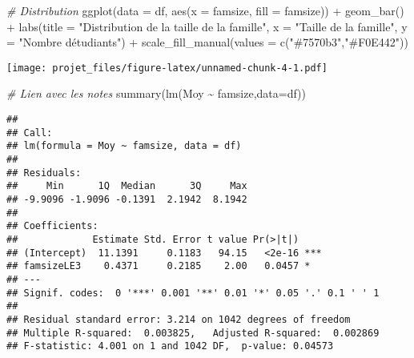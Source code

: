 \documentclass[
]{article}
\newenvironment{Shaded}{\begin{snugshade}}{\end{snugshade}}
\newcommand{\AttributeTok}[1]{\textcolor[rgb]{0.77,0.63,0.00}{#1}}
\newcommand{\CommentTok}[1]{\textcolor[rgb]{0.56,0.35,0.01}{\textit{#1}}}
\newcommand{\FunctionTok}[1]{\textcolor[rgb]{0.00,0.00,0.00}{#1}}
\newcommand{\NormalTok}[1]{#1}
\newcommand{\SpecialCharTok}[1]{\textcolor[rgb]{0.00,0.00,0.00}{#1}}
\newcommand{\StringTok}[1]{\textcolor[rgb]{0.31,0.60,0.02}{#1}}
\begin{document}
\begin{Shaded}
\begin{Highlighting}[]
\CommentTok{\# Distribution}
\FunctionTok{ggplot}\NormalTok{(}\AttributeTok{data =}\NormalTok{ df, }\FunctionTok{aes}\NormalTok{(}\AttributeTok{x =}\NormalTok{ famsize, }\AttributeTok{fill =}\NormalTok{ famsize)) }\SpecialCharTok{+}
  \FunctionTok{geom\_bar}\NormalTok{() }\SpecialCharTok{+}
  \FunctionTok{labs}\NormalTok{(}\AttributeTok{title =} \StringTok{"Distribution de la taille de la famille"}\NormalTok{,}
       \AttributeTok{x =} \StringTok{"Taille de la famille"}\NormalTok{, }\AttributeTok{y =} \StringTok{"Nombre d\textquotesingle{}étudiants"}\NormalTok{) }\SpecialCharTok{+}
  \FunctionTok{scale\_fill\_manual}\NormalTok{(}\AttributeTok{values =} \FunctionTok{c}\NormalTok{(}\StringTok{"\#7570b3"}\NormalTok{,}\StringTok{"\#F0E442"}\NormalTok{))}
\end{Highlighting}
\end{Shaded}

\texttt{[image: projet\_files/figure-latex/unnamed-chunk-4-1.pdf]}

\begin{Shaded}
\begin{Highlighting}[]
\CommentTok{\# Lien avec les notes}
\FunctionTok{summary}\NormalTok{(}\FunctionTok{lm}\NormalTok{(Moy }\SpecialCharTok{\textasciitilde{}}\NormalTok{ famsize,}\AttributeTok{data=}\NormalTok{df))}
\end{Highlighting}
\end{Shaded}

\begin{verbatim}
## 
## Call:
## lm(formula = Moy ~ famsize, data = df)
## 
## Residuals:
##     Min      1Q  Median      3Q     Max 
## -9.9096 -1.9096 -0.1391  2.1942  8.1942 
## 
## Coefficients:
##             Estimate Std. Error t value Pr(>|t|)    
## (Intercept)  11.1391     0.1183   94.15   <2e-16 ***
## famsizeLE3    0.4371     0.2185    2.00   0.0457 *  
## ---
## Signif. codes:  0 '***' 0.001 '**' 0.01 '*' 0.05 '.' 0.1 ' ' 1
## 
## Residual standard error: 3.214 on 1042 degrees of freedom
## Multiple R-squared:  0.003825,   Adjusted R-squared:  0.002869 
## F-statistic: 4.001 on 1 and 1042 DF,  p-value: 0.04573
\end{verbatim}

\begin{Shaded}
\end{Shaded}
\end{document}
